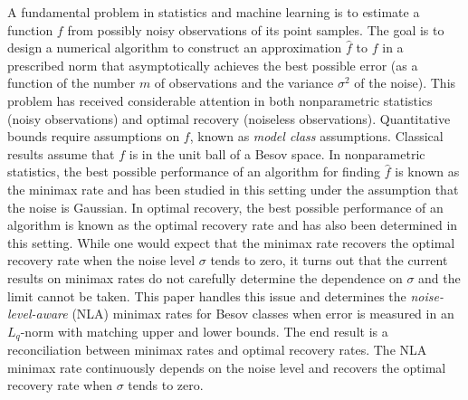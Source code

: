 A fundamental problem in statistics and machine learning is to estimate a function $f$ from possibly noisy observations of its point samples. The goal is to design a numerical algorithm to construct an approximation $\hat f$ to $f$ in a prescribed norm that asymptotically achieves the best possible error (as a function of the number $m$ of observations and the variance $\sigma^2$ of the noise). This problem has received considerable attention in both nonparametric statistics (noisy observations) and  optimal recovery (noiseless observations). Quantitative bounds require assumptions on $f$, known as \emph{model class} assumptions. Classical results assume that $f$ is in the unit  ball of a Besov space. In nonparametric statistics, the best possible performance of an algorithm for finding $\hat f$ is known as the minimax rate and has been studied in this setting under the assumption that the noise is Gaussian. In optimal recovery, the best possible performance of an algorithm is known as the optimal recovery rate and has also been determined in this setting.  While one would expect that the minimax rate recovers the optimal recovery rate when the noise level $\sigma$ tends to zero, it turns out that the current results on  minimax rates do not carefully determine the dependence on $\sigma$ and  the limit cannot be taken. This paper handles this issue and determines the \emph{noise-level-aware} (NLA) minimax rates for Besov classes when error is measured in an $L_q$-norm with matching upper and lower bounds. The end result is a reconciliation between minimax rates and optimal recovery rates. The NLA minimax rate continuously depends on the noise level and recovers the optimal recovery rate when $\sigma$  tends to zero.

